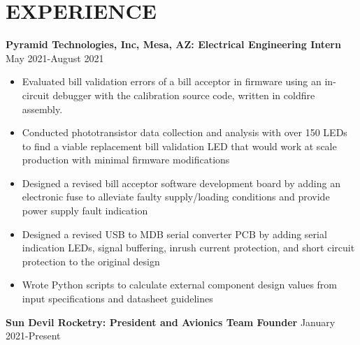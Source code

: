 \documentclass{article}
\begin{document}
\section{EXPERIENCE}
\textbf{Pyramid Technologies, Inc, Mesa, AZ: Electrical Engineering Intern}
\hfill 
\vspace{0.5em}
May 2021-August 2021
\begin{itemize}
\item{Evaluated bill validation errors of a bill acceptor in firmware using an in-circuit debugger with the calibration source code, written in coldfire assembly.}
\item{Conducted phototransistor data collection and analysis with over 150 LEDs to find a viable replacement bill validation LED that would work at scale production with minimal firmware modifications}
\item{Designed a revised bill acceptor software development board by adding an electronic fuse to alleviate faulty supply/loading conditions and provide power supply fault indication}
\item{Designed a revised USB to MDB serial converter PCB by adding serial indication LEDs, signal buffering, inrush current protection, and short circuit protection to the original design}
\item{Wrote Python scripts to calculate external component design values from input specifications and datasheet guidelines}
\end{itemize}
\vspace{0.5em}
\textbf{Sun Devil Rocketry: President and Avionics Team Founder}
\hfill
\vspace{0.5em}
January 2021-Present
\end{document}
